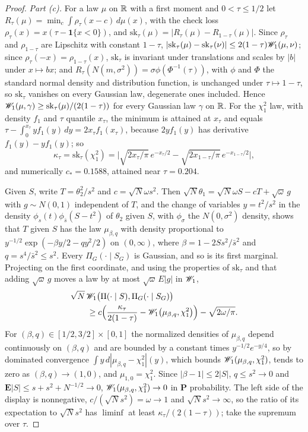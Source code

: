 \begin{proof}
\emph{Part (c).} For a law $\mu$ on $\mathbb{R}$ with a first moment and $0<\tau\le1/2$ let $R_\tau(\mu)=\min_c\int\rho_\tau(x-c)\,d\mu(x)$, with the check loss $\rho_\tau(x)=x(\tau-\mathbf 1\{x<0\})$, and $\mathrm{sk}_\tau(\mu)=|R_\tau(\mu)-R_{1-\tau}(\mu)|$. Since $\rho_\tau$ and $\rho_{1-\tau}$ are Lipschitz with constant $1-\tau$, $|\mathrm{sk}_\tau(\mu)-\mathrm{sk}_\tau(\nu)|\le2(1-\tau)\mathscr{W}_1(\mu,\nu)$; since $\rho_\tau(-x)=\rho_{1-\tau}(x)$, $\mathrm{sk}_\tau$ is invariant under translations and scales by $|b|$ under $x\mapsto bx$; and $R_\tau(N(m,\sigma^2))=\sigma\phi(\Phi^{-1}(\tau))$, with $\phi$ and $\Phi$ the standard normal density and distribution function, is unchanged under $\tau\mapsto1-\tau$, so $\mathrm{sk}_\tau$ vanishes on every Gaussian law, degenerate ones included. Hence $\mathscr{W}_1(\mu,\gamma)\ge\mathrm{sk}_\tau(\mu)/(2(1-\tau))$ for every Gaussian law $\gamma$ on $\mathbb{R}$. For the $\chi^2_1$ law, with density $f_1$ and $\tau$ quantile $x_\tau$, the minimum is attained at $x_\tau$ and equals $\tau-\int_0^{x_\tau}yf_1(y)\,dy=2x_\tau f_1(x_\tau)$, because $2yf_1(y)$ has derivative $f_1(y)-yf_1(y)$; so
\[
\kappa_\tau=\mathrm{sk}_\tau(\chi^2_1)=\Big|\sqrt{2x_\tau/\pi}\,e^{-x_\tau/2}-\sqrt{2x_{1-\tau}/\pi}\,e^{-x_{1-\tau}/2}\Big| ,
\]
and numerically $c_\ast=0.1588$, attained near $\tau=0.204$.

Given $S$, write $T=\theta_2^2/s^2$ and $c=\sqrt N\omega s^2$. Then $\sqrt N\theta_1=\sqrt N\omega S-cT+\sqrt\omega\,g$ with $g\sim N(0,1)$ independent of $T$, and the change of variables $y=t^2/s^2$ in the density $\phi_s(t)\phi_{\bar s}(S-t^2)$ of $\theta_2$ given $S$, with $\phi_\sigma$ the $N(0,\sigma^2)$ density, shows that $T$ given $S$ has the law $\mu_{\beta,q}$ with density proportional to $y^{-1/2}\exp(-\beta y/2-qy^2/2)$ on $(0,\infty)$, where $\beta=1-2Ss^2/\bar s^2$ and $q=s^4/\bar s^2\le s^2$. Every $\Pi_G(\cdot\mid S_G)$ is Gaussian, and so is its first marginal. Projecting on the first coordinate, and using the properties of $\mathrm{sk}_\tau$ and that adding $\sqrt\omega\,g$ moves a law by at most $\sqrt\omega\,E|g|$ in $\mathscr{W}_1$,
\[
\begin{aligned}
&\sqrt N\,\mathscr{W}_1\big(\Pi(\cdot\mid S),\Pi_G(\cdot\mid S_G)\big)\\
&\qquad\ge c\Big(\frac{\kappa_\tau}{2(1-\tau)}-\mathscr{W}_1\big(\mu_{\beta,q},\chi^2_1\big)\Big)-\sqrt{2\omega/\pi} .
\end{aligned}
\]
For $(\beta,q)\in[1/2,3/2]\times[0,1]$ the normalized densities of $\mu_{\beta,q}$ depend continuously on $(\beta,q)$ and are bounded by a constant times $y^{-1/2}e^{-y/4}$, so by dominated convergence $\int y\,d|\mu_{\beta,q}-\chi^2_1|(y)$, which bounds $\mathscr{W}_1(\mu_{\beta,q},\chi^2_1)$, tends to zero as $(\beta,q)\to(1,0)$, and $\mu_{1,0}=\chi^2_1$. Since $|\beta-1|\le2|S|$, $q\le s^2\to0$ and $\mathbf E|S|\le s+s^2+N^{-1/2}\to0$, $\mathscr{W}_1(\mu_{\beta,q},\chi^2_1)\to0$ in $\mathbf P$ probability. The left side of the display is nonnegative, $c/(\sqrt Ns^2)=\omega\to1$ and $\sqrt Ns^2\to\infty$, so the ratio of its expectation to $\sqrt Ns^2$ has $\liminf$ at least $\kappa_\tau/(2(1-\tau))$; take the supremum over $\tau$.


\end{proof}
